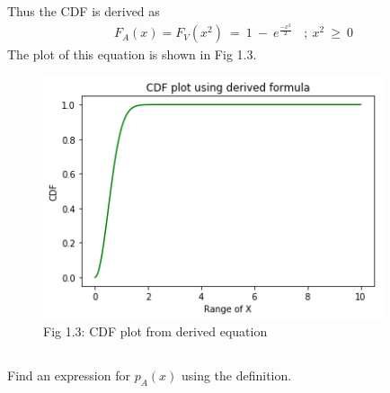 \documentclass[journal,12pt,twocolumn]{IEEEtran}
\begin{document}
\begin{mdframed}
Thus the CDF is derived as\\
\begin{align*} F_A(x) =  F_V(x^2)\ =\ 1\ -\ e^\frac{-x^2}{2}\ \ \ \ ;\ x^2\ \geq\ 0\end{align*}
The plot of this equation is shown in Fig 1.3.
\end{mdframed}
\begin{figure}[h!]
    \centering
    \includegraphics[width=10cm]{Assignment-1/Codes/Figures/cdf_actual_Vs_simulate.png}
    \caption*{Fig 1.3: CDF plot from derived equation}
\end{figure}
\subsection*{}
Find an expression for $p_A(x)$ using the definition.

\subsection*{}\\
\end{document}
